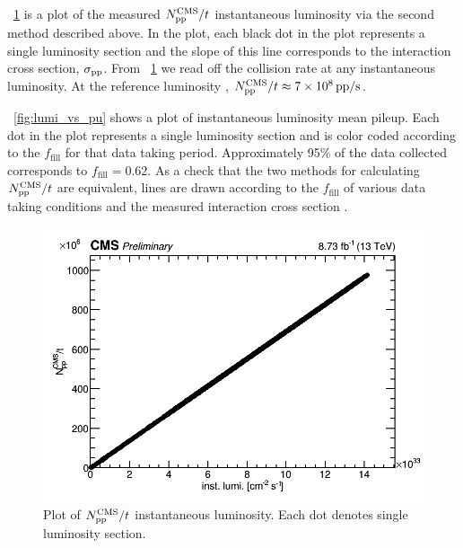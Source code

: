 \Fig~\ref{fig:dppdt_vs_L} is a plot of the measured $N_\text{\pp}^\text{CMS}/t$ \vs instantaneous luminosity via the second method described above. In the plot, each black dot in the plot represents a single luminosity section and the slope of this line corresponds to the \pp interaction cross section, $\sigma_\text{\ensuremath{\mathrm{p}}\ensuremath{\mathrm{p}}}$. From \FigDot~\ref{fig:dppdt_vs_L} we read off the \pp collision rate at any instantaneous luminosity. At the reference luminosity , $N_\text{\ensuremath{\mathrm{p}}\ensuremath{\mathrm{p}}}^\text{CMS}/t \approx 7\times10^8 \text{\,\text{\ensuremath{\mathrm{p}}\ensuremath{\mathrm{p}}}/s}$.  

\Fig~\ref{fig:lumi_vs_pu} shows a plot of instantaneous luminosity \vs mean pileup. Each dot in the plot represents a single luminosity section and is color coded according to the $f_\text{fill}$ for that data taking period. Approximately 95\% of the data collected corresponds to $f_\text{fill} = 0.62$. As a check that the two methods for calculating $N_\text{\pp}^\text{CMS}/t$ are equivalent, lines are drawn according to the $f_\text{fill}$ of various data taking conditions and the measured \pp interaction cross section \cite{Bawej:1711011, Sirunyan:2018nqx}. 

\begin{figure}
	\centering
	\includegraphics[width=\dummyFigWidth]{figures/neutron/dppdt_vs_L.png}
  \caption[Plot of $N_\text{\pp}^\text{CMS}/t$ \vs instantaneous luminosity.]{Plot of $N_\text{\pp}^\text{CMS}/t$ \vs instantaneous luminosity. Each dot denotes single luminosity section.}
	\label{fig:dppdt_vs_L}
\end{figure}

